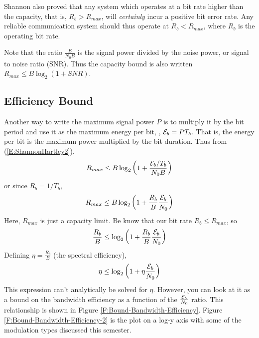 Shannon also proved that any system which operates at a bit rate
higher than the capacity, that is, $R_b > R_{max}$, will \emph{certainly} incur a positive bit error rate. Any reliable communication system should thus operate at $R_b < R_{max}$, where $R_b$ is the operating bit rate.

Note that the ratio $\frac{E}{N_0 B}$ is the signal power divided by
the noise power, or signal to noise ratio (SNR).  Thus the capacity
bound is also written $R_{max} \le B \log_2 ( 1 + SNR )$.


\subsection{Efficiency Bound}

Another way to write the maximum signal power $P$ is to multiply it
by the bit period and use it as the maximum energy per bit, \ie,
$\mathcal{E}_b = P T_b$. That is, the energy per bit is the maximum power
multiplied by the bit duration. Thus from (\ref{E:ShannonHartley2}),
\begin{equation}
  R_{max} \le B \log_2 \left( 1 + \frac{\mathcal{E}_b / T_b}{N_0 B}\right) \nonumber
\end{equation}
or since $R_b = 1/T_b$,
\begin{equation}
  R_{max} \le B \log_2 \left( 1 + \frac{R_b}{B} \frac{\mathcal{E}_b}{N_0}\right) \nonumber
\end{equation}
Here, $R_{max}$ is just a capacity limit.  Be know that our bit rate $R_b
\le R_{max}$, so
\begin{equation}
  \frac{R_b}{B} \le \log_2 \left( 1 + \frac{R_b}{B} \frac{\mathcal{E}_b}{N_0}\right) \nonumber
\end{equation}
Defining $\eta=\frac{R_b}{B}$ (the spectral efficiency),
\begin{equation}
  \eta \le \log_2 \left( 1 + \eta \frac{\mathcal{E}_b}{N_0}\right) \nonumber
\end{equation}
This expression can't analytically be solved for $\eta$.  However,
you can look at it as a bound on the bandwidth efficiency as a
function of the $\frac{\mathcal{E}_b}{N_0}$ ratio.  This relationship is
shown in Figure \ref{F:Bound-Bandwidth-Efficiency}.  Figure
\ref{F:Bound-Bandwidth-Efficiency-2} is the plot on a log-y axis
with some of the modulation types discussed this semester.



